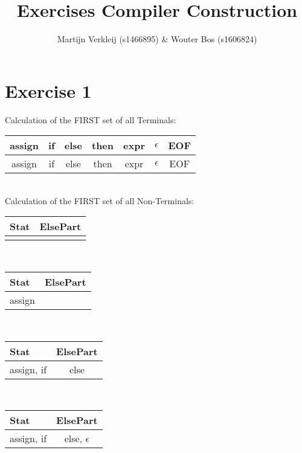 \documentclass[11pt]{article} %
\title{Exercises Compiler Construction}
\author{Martijn Verkleij (s1466895) \& Wouter Bos (s1606824)}
\begin{document}
\maketitle

\section*{Exercise 1}
Calculation of the FIRST set of all Terminals:\\

\begin{tabular}{|c|c|c|c|c|c|c|} \hline 
\textbf{assign}
& \textbf{if}
& \textbf{else}
& \textbf{then}
& \textbf{expr}
& \textbf{$\epsilon$}
& \textbf{EOF} \\\hline 

assign
& if
& else
& then
& expr
& $\epsilon$
& EOF \\\hline 
\end{tabular} \\

\noindent Calculation of the FIRST set of all Non-Terminals:\\

\begin{tabular}{|p{2cm}|c|} \hline 
\textbf{Stat}
& \textbf{ElsePart} \\\hline 

& \\\hline 
\end{tabular} \\

\begin{tabular}{|p{2cm}|c|} \hline 
\textbf{Stat}
& \textbf{ElsePart} \\\hline 

assign
& \\\hline 
\end{tabular} \\

\begin{tabular}{|p{2cm}|c|} \hline 
\textbf{Stat}
& \textbf{ElsePart} \\\hline 

assign, if
& else \\\hline 
\end{tabular} \\

\begin{tabular}{|p{2cm}|c|} \hline 
\textbf{Stat}
& \textbf{ElsePart} \\\hline

assign, if
& else, $\epsilon$ \\\hline 
\end{tabular}\\
\end{document}
